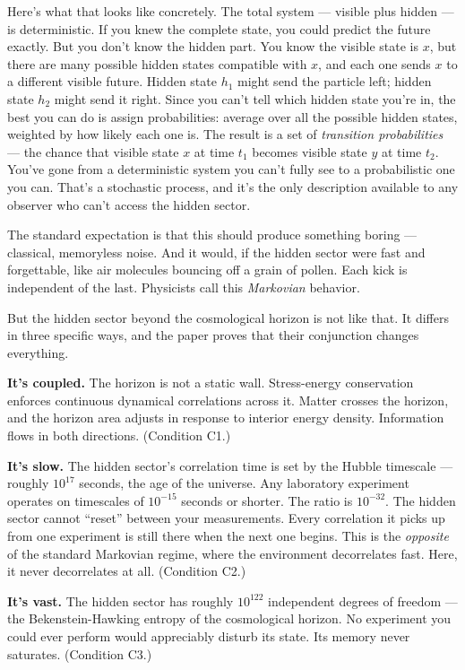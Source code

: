 \documentclass[
]{article}
\begin{document}
Here's what that looks like concretely. The total system --- visible
plus hidden --- is deterministic. If you knew the complete state, you
could predict the future exactly. But you don't know the hidden part.
You know the visible state is \(x\), but there are many possible hidden
states compatible with \(x\), and each one sends \(x\) to a different
visible future. Hidden state \(h_1\) might send the particle left;
hidden state \(h_2\) might send it right. Since you can't tell which
hidden state you're in, the best you can do is assign probabilities:
average over all the possible hidden states, weighted by how likely each
one is. The result is a set of \emph{transition probabilities} --- the
chance that visible state \(x\) at time \(t_1\) becomes visible state
\(y\) at time \(t_2\). You've gone from a deterministic system you can't
fully see to a probabilistic one you can. That's a stochastic process,
and it's the only description available to any observer who can't access
the hidden sector.

The standard expectation is that this should produce something boring
--- classical, memoryless noise. And it would, if the hidden sector were
fast and forgettable, like air molecules bouncing off a grain of pollen.
Each kick is independent of the last. Physicists call this
\emph{Markovian} behavior.

But the hidden sector beyond the cosmological horizon is not like that.
It differs in three specific ways, and the paper proves that their
conjunction changes everything.

\textbf{It's coupled.} The horizon is not a static wall. Stress-energy
conservation enforces continuous dynamical correlations across it.
Matter crosses the horizon, and the horizon area adjusts in response to
interior energy density. Information flows in both directions.
(Condition C1.)

\textbf{It's slow.} The hidden sector's correlation time is set by the
Hubble timescale --- roughly \(10^{17}\) seconds, the age of the
universe. Any laboratory experiment operates on timescales of
\(10^{-15}\) seconds or shorter. The ratio is \(10^{-32}\). The hidden
sector cannot ``reset'' between your measurements. Every correlation it
picks up from one experiment is still there when the next one begins.
This is the \emph{opposite} of the standard Markovian regime, where the
environment decorrelates fast. Here, it never decorrelates at all.
(Condition C2.)

\textbf{It's vast.} The hidden sector has roughly \(10^{122}\)
independent degrees of freedom --- the Bekenstein-Hawking entropy of the
cosmological horizon. No experiment you could ever perform would
appreciably disturb its state. Its memory never saturates. (Condition
C3.)
\end{document}
